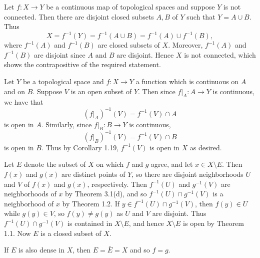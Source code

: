 \begin{prob}
Let $f: X \to Y$ be a continuous map of topological spaces and suppose $Y$ is not connected. Then there are disjoint closed subsets $A, B$ of $Y$ such that $Y = A\cup B$. Thus \[X = f^{-1}(Y) = f^{-1}(A\cup B) = f^{-1}(A)\cup f^{-1}(B),\] where $f^{-1}(A)$ and $f^{-1}(B)$ are closed subsets of $X$. Moreover, $f^{-1}(A)$ and $f^{-1}(B)$ are disjoint since $A$ and $B$ are disjoint. Hence $X$ is not connected, which shows the contrapositive of the required statement.
\end{prob}

\begin{prob}
Let $Y$ be a topological space and $f: X \to Y$ a function which is continuous on $A$ and on $B$. Suppose $V$ is an open subset of $Y$. Then since $f|_A: A \to Y$ is continuous, we have that \[(f|_A)^{-1}(V) = f^{-1}(V)\cap A\] is open in $A$. Similarly, since $f|_B: B \to Y$ is continuous, \[(f|_B)^{-1}(V) = f^{-1}(V)\cap B\] is open in $B$. Thus by Corollary 1.19, $f^{-1}(V)$ is open in $X$ as desired.
\end{prob}

\begin{prob}
Let $E$ denote the subset of $X$ on which $f$ and $g$ agree, and let $x \in X\setminus E$. Then $f(x)$ and $g(x)$ are distinct points of $Y$, so there are disjoint neighborhoods $U$ and $V$ of $f(x)$ and $g(x)$, respectively. Then $f^{-1}(U)$ and $g^{-1}(V)$ are neighborhoods of $x$ by Theorem 3.1(d), and so $f^{-1}(U)\cap g^{-1}(V)$ is a neighborhood of $x$ by Theorem 1.2. If $y \in f^{-1}(U)\cap g^{-1}(V)$, then $f(y) \in U$ while $g(y) \in V$, so $f(y) \not = g(y)$ as $U$ and $V$ are disjoint. Thus $f^{-1}(U)\cap g^{-1}(V)$ is contained in $X\setminus E$, and hence $X\setminus E$ is open by Theorem 1.1. Now $E$ is a closed subset of $X$.

If $E$ is also dense in $X$, then $E = \bar{E} = X$ and so $f = g$.
\end{prob}

